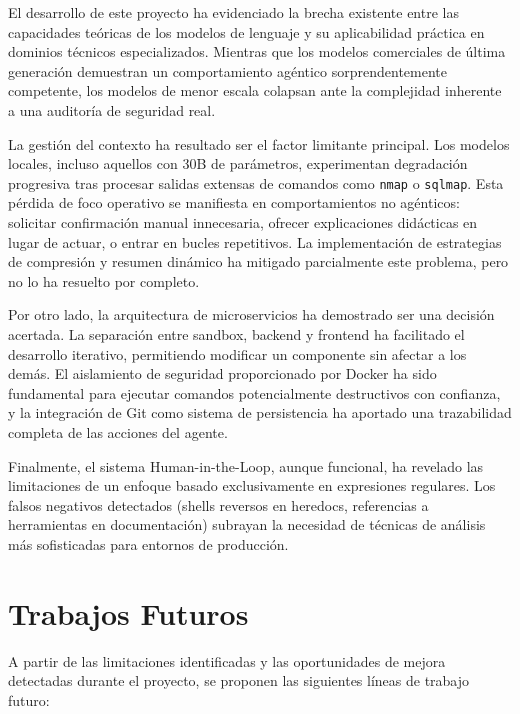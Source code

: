 El desarrollo de este proyecto ha evidenciado la brecha existente entre las capacidades teóricas de los modelos de lenguaje y su aplicabilidad práctica en dominios técnicos especializados. Mientras que los modelos comerciales de última generación demuestran un comportamiento agéntico sorprendentemente competente, los modelos de menor escala colapsan ante la complejidad inherente a una auditoría de seguridad real.

La gestión del contexto ha resultado ser el factor limitante principal. Los modelos locales, incluso aquellos con 30B de parámetros, experimentan degradación progresiva tras procesar salidas extensas de comandos como \texttt{nmap} o \texttt{sqlmap}. Esta pérdida de foco operativo se manifiesta en comportamientos no agénticos: solicitar confirmación manual innecesaria, ofrecer explicaciones didácticas en lugar de actuar, o entrar en bucles repetitivos. La implementación de estrategias de compresión y resumen dinámico ha mitigado parcialmente este problema, pero no lo ha resuelto por completo.

Por otro lado, la arquitectura de microservicios ha demostrado ser una decisión acertada. La separación entre sandbox, backend y frontend ha facilitado el desarrollo iterativo, permitiendo modificar un componente sin afectar a los demás. El aislamiento de seguridad proporcionado por Docker ha sido fundamental para ejecutar comandos potencialmente destructivos con confianza, y la integración de Git como sistema de persistencia ha aportado una trazabilidad completa de las acciones del agente.

Finalmente, el sistema Human-in-the-Loop, aunque funcional, ha revelado las limitaciones de un enfoque basado exclusivamente en expresiones regulares. Los falsos negativos detectados (shells reversos en heredocs, referencias a herramientas en documentación) subrayan la necesidad de técnicas de análisis más sofisticadas para entornos de producción.


\section{Trabajos Futuros}
\label{sec:trabajos_futuros}

A partir de las limitaciones identificadas y las oportunidades de mejora detectadas durante el proyecto, se proponen las siguientes líneas de trabajo futuro:

